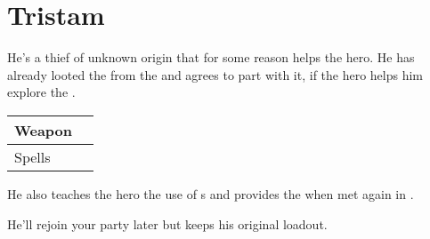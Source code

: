 \section{Tristam}
\label{char:tristam}


He’s a thief of unknown origin that for some reason helps the hero. He has already looted the  from the  and agrees to part with it, if the hero helps him explore the .

\bigskip
\begin{tabular}{ l | l }
	Weapon & \nameref{weapon:ninja_stars} \\
	\hline
	Spells & \nameref{spell:life}
\end{tabular}
\bigskip

He also teaches the hero the use of s and provides the  when met again in .

\bigskip

He’ll rejoin your party later but keeps his original loadout. 
